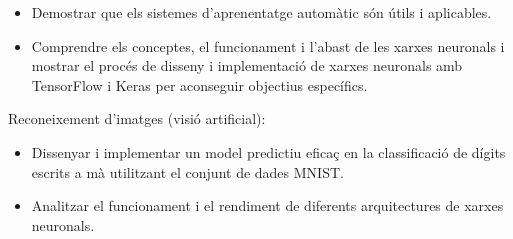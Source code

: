 \begin{refsection}
\begin{itemize}
		\item Demostrar que els sistemes d'aprenentatge automàtic són útils i aplicables.
		
		\item Comprendre els conceptes, el funcionament i l'abast de les xarxes neuronals i mostrar el procés de disseny i implementació de xarxes neuronals amb TensorFlow i Keras per aconseguir objectius específics.
		
	\end{itemize}
	
	Reconeixement d'imatges (visió artificial):
	
	\begin{itemize}
		
		\item Dissenyar i implementar un model predictiu eficaç en la classificació de dígits escrits a mà utilitzant el conjunt de dades MNIST.
		
		\item Analitzar el funcionament i el rendiment de diferents arquitectures de xarxes neuronals.
		
	\end{itemize}
	
	\printbibliography[heading=subbibintoc]

\end{refsection}
